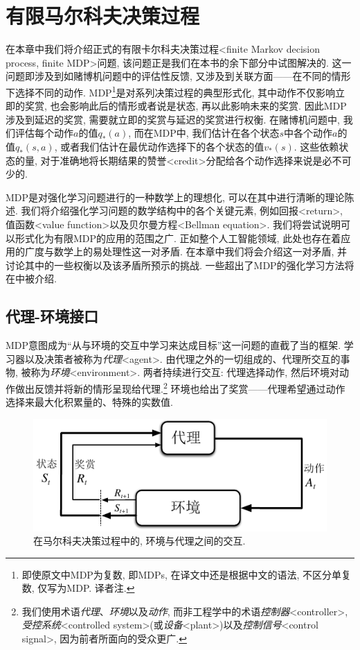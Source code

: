 \chapter{有限马尔科夫决策过程}\label{chap:3}

在本章中我们将介绍正式的有限卡尔科夫决策过程<finite Markov decision process, finite MDP>问题, 该问题正是我们在本书的余下部分中试图解决的. 这一问题即涉及到如赌博机问题中的评估性反馈, 又涉及到关联方面——在不同的情形下选择不同的动作. MDP\footnote{即使原文中MDP为复数, 即MDPs, 在译文中还是根据中文的语法, 不区分单复数, 仅写为MDP. 译者注.}是对系列决策过程的典型形式化, 其中动作不仅影响立即的奖赏, 也会影响此后的情形或者说是状态, 再以此影响未来的奖赏. 因此MDP涉及到延迟的奖赏, 需要就立即的奖赏与延迟的奖赏进行权衡. 在赌博机问题中, 我们评估每个动作$a$的值$q_*(a)$, 而在MDP中, 我们估计在各个状态$s$中各个动作$a$的值$q_*(s, a)$, 或者我们估计在最优动作选择下的各个状态的值$v_*(s)$. 这些依赖状态的量, 对于准确地将长期结果的赞誉<credit>分配给各个动作选择来说是必不可少的.

MDP是对强化学习问题进行的一种数学上的理想化, 可以在其中进行清晰的理论陈述. 我们将介绍强化学习问题的数学结构中的各个关键元素, 例如回报<return>, 值函数<value function>以及贝尔曼方程<Bellman equation>. 我们将尝试说明可以形式化为有限MDP的应用的范围之广. 正如整个人工智能领域, 此处也存在着应用的广度与数学上的易处理性这一对矛盾. 在本章中我们将会介绍这一对矛盾, 并讨论其中的一些权衡以及该矛盾所预示的挑战. 一些超出了MDP的强化学习方法将在中被介绍.

\section{代理-环境接口}\label{sec:3.1}

MDP意图成为``从与环境的交互中学习来达成目标''这一问题的直截了当的框架. 学习器以及决策者被称为\emph{代理}<agent>. 由代理之外的一切组成的、代理所交互的事物, 被称为\emph{环境}<environment>. 两者持续进行交互: 代理选择动作, 然后环境对动作做出反馈并将新的情形呈现给代理.\footnote{我们使用术语\emph{代理}、\emph{环境}以及\emph{动作}, 而非工程学中的术语\emph{控制器}<controller>, \emph{受控系统}<controlled system>(或\emph{设备}<plant>)以及\emph{控制信号}<control signal>, 因为前者所面向的受众更广.} 环境也给出了奖赏——代理希望通过动作选择来最大化积累量的、特殊的实数值. 

\begin{figure}[ht]
\centering
\includegraphics[width=.75\textwidth]{c3/img/figure3-1.pdf}
\caption{在马尔科夫决策过程中的, 环境与代理之间的交互.}\label{fig:3.1}
\end{figure}

